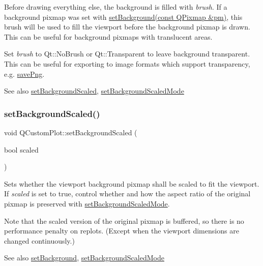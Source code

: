 Before drawing everything else, the background is filled with {\itshape brush}. If a background pixmap was set with \hyperlink{classQCustomPlot_a130358592cfca353ff3cf5571b49fb00}{set\+Background(const Q\+Pixmap \&pm)}, this brush will be used to fill the viewport before the background pixmap is drawn. This can be useful for background pixmaps with translucent areas.

Set {\itshape brush} to Qt\+::\+No\+Brush or Qt\+::\+Transparent to leave background transparent. This can be useful for exporting to image formats which support transparency, e.\+g. \hyperlink{classQCustomPlot_ac92cc9256d12f354b40a4be4600b5fb9}{save\+Png}.

\begin{DoxySeeAlso}{See also}
\hyperlink{classQCustomPlot_a36f0fa1317325dc7b7efea615ee2de1f}{set\+Background\+Scaled}, \hyperlink{classQCustomPlot_a4c0eb4865b7949f62e1cb97db04a3de0}{set\+Background\+Scaled\+Mode} 
\end{DoxySeeAlso}
\mbox{\label{classQCustomPlot_a36f0fa1317325dc7b7efea615ee2de1f}} 
\subsubsection{\texorpdfstring{set\+Background\+Scaled()}{setBackgroundScaled()}}
{\footnotesize\ttfamily void Q\+Custom\+Plot\+::set\+Background\+Scaled (\begin{DoxyParamCaption}\item[{bool}]{scaled }\end{DoxyParamCaption})}

Sets whether the viewport background pixmap shall be scaled to fit the viewport. If {\itshape scaled} is set to true, control whether and how the aspect ratio of the original pixmap is preserved with \hyperlink{classQCustomPlot_a4c0eb4865b7949f62e1cb97db04a3de0}{set\+Background\+Scaled\+Mode}.

Note that the scaled version of the original pixmap is buffered, so there is no performance penalty on replots. (Except when the viewport dimensions are changed continuously.)

\begin{DoxySeeAlso}{See also}
\hyperlink{classQCustomPlot_a130358592cfca353ff3cf5571b49fb00}{set\+Background}, \hyperlink{classQCustomPlot_a4c0eb4865b7949f62e1cb97db04a3de0}{set\+Background\+Scaled\+Mode} 
\end{DoxySeeAlso}
\mbox{\label{classQCustomPlot_a4c0eb4865b7949f62e1cb97db04a3de0}} 
